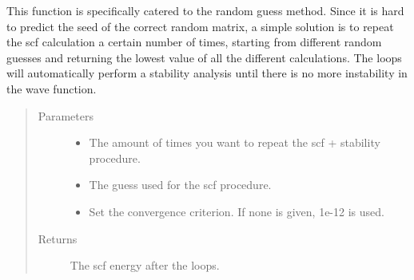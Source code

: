 \documentclass[letterpaper,10pt,english]{sphinxmanual}
\begin{document}
\begin{fulllineitems}
\begin{fulllineitems}
\begin{quote}
\begin{description}
\end{description}\end{quote}

\end{fulllineitems}


\begin{fulllineitems}
\label{\detokenize{Complex_GHF:ghf.complex_GHF.ComplexGHF.loop_calculations}}
This function is specifically catered to the random guess method. Since it is hard to predict the seed of the
correct random matrix, a simple solution is to repeat the scf calculation a certain number of times, starting
from different random guesses and returning the lowest value of all the different calculations. The loops will
automatically perform a stability analysis until there is no more instability in the wave function.
\begin{quote}\begin{description}
\item[{Parameters}] \leavevmode\begin{itemize}
\item {} 
 \textendash{} The amount of times you want to repeat the scf + stability procedure.

\item {} 
 \textendash{} The guess used for the scf procedure.

\item {} 
 \textendash{} Set the convergence criterion. If none is given, 1e-12 is used.

\end{itemize}

\item[{Returns}] \leavevmode
The scf energy after the loops.

\end{description}\end{quote}

\end{fulllineitems}



\end{fulllineitems}
\end{document}
